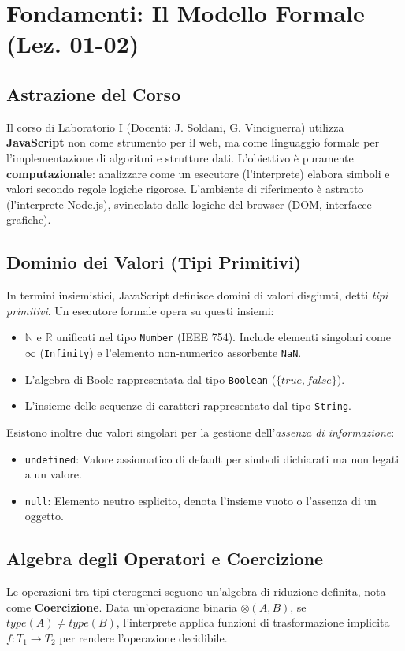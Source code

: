 \section{Fondamenti: Il Modello Formale (Lez. 01-02)}

\subsection{Astrazione del Corso}
Il corso di Laboratorio I (Docenti: J. Soldani, G. Vinciguerra) utilizza \textbf{JavaScript} non come strumento per il web, ma come linguaggio formale per l'implementazione di algoritmi e strutture dati.
L'obiettivo è puramente \textbf{computazionale}: analizzare come un esecutore (l'interprete) elabora simboli e valori secondo regole logiche rigorose.
L'ambiente di riferimento è astratto (l'interprete Node.js), svincolato dalle logiche del browser (DOM, interfacce grafiche).

\subsection{Dominio dei Valori (Tipi Primitivi)}
In termini insiemistici, JavaScript definisce domini di valori disgiunti, detti \textit{tipi primitivi}. Un esecutore formale opera su questi insiemi:

\begin{itemize}
    \item $\mathbb{N}$ e $\mathbb{R}$ unificati nel tipo \texttt{Number} (IEEE 754). Include elementi singolari come $\infty$ (\texttt{Infinity}) e l'elemento non-numerico assorbente \texttt{NaN}.
    \item L'algebra di Boole rappresentata dal tipo \texttt{Boolean} ($\{true, false\}$).
    \item L'insieme delle sequenze di caratteri rappresentato dal tipo \texttt{String}.
\end{itemize}

Esistono inoltre due valori singolari per la gestione dell'\textit{assenza di informazione}:
\begin{itemize}
    \item \texttt{undefined}: Valore assiomatico di default per simboli dichiarati ma non legati a un valore.
    \item \texttt{null}: Elemento neutro esplicito, denota l'insieme vuoto o l'assenza di un oggetto.
\end{itemize}

\subsection{Algebra degli Operatori e Coercizione}
Le operazioni tra tipi eterogenei seguono un'algebra di riduzione definita, nota come \textbf{Coercizione}.
Data un'operazione binaria $\otimes(A, B)$, se $type(A) \neq type(B)$, l'interprete applica funzioni di trasformazione implicita $f: T_1 \to T_2$ per rendere l'operazione decidibile.

